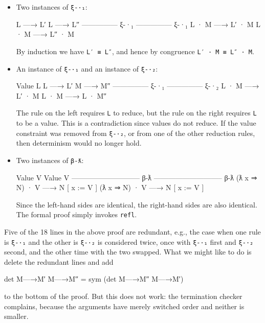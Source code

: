 \begin{itemize}
\item
  Two instances of \texttt{ξ-·₁}:

  \begin{myDisplay}
  L —→ L′                 L —→ L″
  --------------- ξ-·₁    --------------- ξ-·₁
  L · M —→ L′ · M         L · M —→ L″ · M
  \end{myDisplay}

  By induction we have \texttt{L′\ ≡\ L″}, and hence by congruence
  \texttt{L′\ ·\ M\ ≡\ L″\ ·\ M}.
\item
  An instance of \texttt{ξ-·₁} and an instance of \texttt{ξ-·₂}:

  \begin{myDisplay}
                          Value L
  L —→ L′                 M —→ M″
  --------------- ξ-·₁    --------------- ξ-·₂
  L · M —→ L′ · M         L · M —→ L · M″
  \end{myDisplay}

  The rule on the left requires \texttt{L} to reduce, but the rule on
  the right requires \texttt{L} to be a value. This is a contradiction
  since values do not reduce. If the value constraint was removed from
  \texttt{ξ-·₂}, or from one of the other reduction rules, then
  determinism would no longer hold.
\item
  Two instances of \texttt{β-ƛ}:

  \begin{myDisplay}
  Value V                              Value V
  ----------------------------- β-ƛ    ----------------------------- β-ƛ
  (ƛ x ⇒ N) · V —→ N [ x := V ]        (ƛ x ⇒ N) · V —→ N [ x := V ]
  \end{myDisplay}

  Since the left-hand sides are identical, the right-hand sides are also
  identical. The formal proof simply invokes \texttt{refl}.
\end{itemize}

Five of the 18 lines in the above proof are redundant, e.g., the case
when one rule is \texttt{ξ-·₁} and the other is \texttt{ξ-·₂} is
considered twice, once with \texttt{ξ-·₁} first and \texttt{ξ-·₂}
second, and the other time with the two swapped. What we might like to
do is delete the redundant lines and add

\begin{myDisplay}
det M—→M′ M—→M″ = sym (det M—→M″ M—→M′)
\end{myDisplay}

to the bottom of the proof. But this does not work: the termination
checker complains, because the arguments have merely switched order and
neither is smaller.

